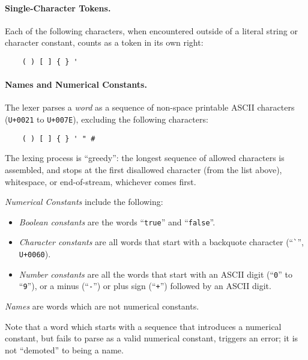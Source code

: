 \paragraph{Single-Character Tokens.} Each of the following characters,
when encountered outside of a literal string or character constant, counts
as a token in its own right:
\begin{verbatim}
    ( ) [ ] { } '
\end{verbatim}

\paragraph{Names and Numerical Constants.} The lexer parses a
\emph{word} as a sequence of non-space printable ASCII characters
(\verb|U+0021| to \verb|U+007E|), excluding the following characters:
\begin{verbatim}
    ( ) [ ] { } ' " #
\end{verbatim}
The lexing process is ``greedy'': the longest sequence of allowed
characters is assembled, and stops at the first disallowed character
(from the list above), whitespace, or end-of-stream, whichever comes
first.

\emph{Numerical Constants} include the following:
\begin{itemize}

    \item \emph{Boolean constants} are the words ``\verb|true|'' and
    ``\verb|false|''.

    \item \emph{Character constants} are all words that start with a
    backquote character (``\verb|`|'', \verb|U+0060|).

    \item \emph{Number constants} are all the words that start with an
    ASCII digit (``\verb|0|'' to ``\verb|9|''), or a minus
    (``\verb|-|'') or plus sign (``\verb|+|'') followed by an ASCII
    digit.

\end{itemize}

\emph{Names} are words which are not numerical constants.

Note that a word which starts with a sequence that introduces a numerical
constant, but fails to parse as a valid numerical constant, triggers an
error; it is not ``demoted'' to being a name.


